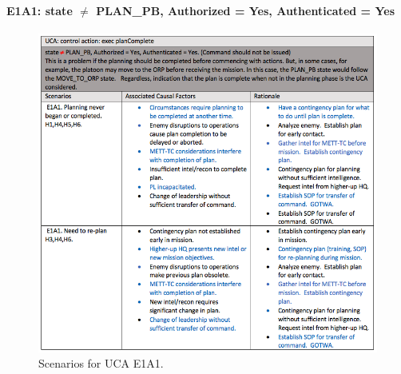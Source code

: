 \documentclass[../../main/main.tex]{subfiles}
\begin{document}
\paragraph*{E1A1: state  $\neq$ PLAN_PB, Authorized = Yes, Authenticated = Yes}

\begin{figure}[ht!]
\begin{center}
\includegraphics[width=\linewidth]{../figures/ucaea1}
\caption{Scenarios for UCA E1A1.}
\label{ucaea1}
\end{center}
\end{figure}
\clearpage
\end{document}
